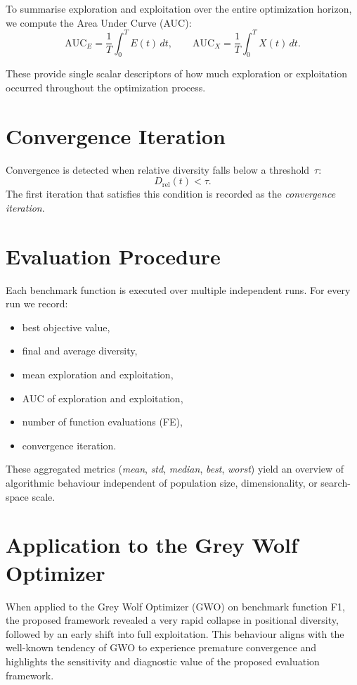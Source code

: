 \documentclass[12pt]{article}
\begin{document}
To summarise exploration and exploitation over the entire optimization horizon,
we compute the Area Under Curve (AUC):
\[
\mathrm{AUC}_E 
= \frac{1}{T} \int_0^T E(t)\, dt,
\qquad
\mathrm{AUC}_X 
= \frac{1}{T} \int_0^T X(t)\, dt.
\]

These provide single scalar descriptors of how much exploration
or exploitation occurred throughout the optimization process.

\section{Convergence Iteration}

Convergence is detected when relative diversity falls below a threshold~$\tau$:
\[
D_{\text{rel}}(t) < \tau.
\]
The first iteration that satisfies this condition is recorded as
the \emph{convergence iteration}.

\section{Evaluation Procedure}

Each benchmark function is executed over multiple independent runs.
For every run we record:

\begin{itemize}
    \item best objective value,
    \item final and average diversity,
    \item mean exploration and exploitation,
    \item AUC of exploration and exploitation,
    \item number of function evaluations (FE),
    \item convergence iteration.
\end{itemize}

These aggregated metrics (\textit{mean}, \textit{std}, \textit{median}, \textit{best}, \textit{worst})
yield an overview of algorithmic behaviour
independent of population size, dimensionality, or search-space scale.

\section{Application to the Grey Wolf Optimizer}

When applied to the Grey Wolf Optimizer (GWO) on benchmark function F1,
the proposed framework revealed a very rapid collapse in positional diversity,
followed by an early shift into full exploitation.
This behaviour aligns with the well-known tendency of GWO to experience premature convergence
and highlights the sensitivity and diagnostic value of the proposed evaluation framework.
\end{document}
